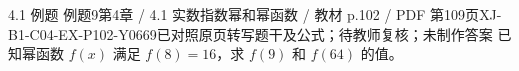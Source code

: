 \par\noindent\begin{minipage}{\linewidth}
\begin{bankitem}{4.1 例题 例题9}{第4章 / 4.1 实数指数幂和幂函数 / 教材 p.102 / PDF 第109页}{XJ-B1-C04-EX-P102-Y0669}{已对照原页转写题干及公式；待教师复核；未制作答案}
已知幂函数 $f(x)$ 满足 $f(8)=16$，求 $f(9)$ 和 $f(64)$ 的值。
\end{bankitem}
\end{minipage}\par\medskip
